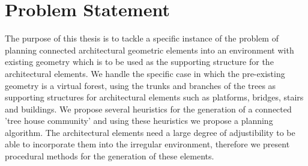 \chapter{Problem Statement}
\label{sec:problem}


The purpose of this thesis is to tackle a specific instance of the problem of planning connected architectural geometric elements into an environment with existing geometry which is to be used as the supporting structure for the architectural elements. We handle the specific case in which the pre-existing geometry is a virtual forest, using the trunks and branches of the trees as supporting structures for architectural elements such as platforms, bridges, stairs and buildings. We propose several heuristics for the generation of a connected 'tree house community' and using these heuristics we propose a planning algorithm. The architectural elements need a large degree of adjustibility to be able to incorporate them into the irregular environment, therefore we present procedural methods for the generation of these elements.       







